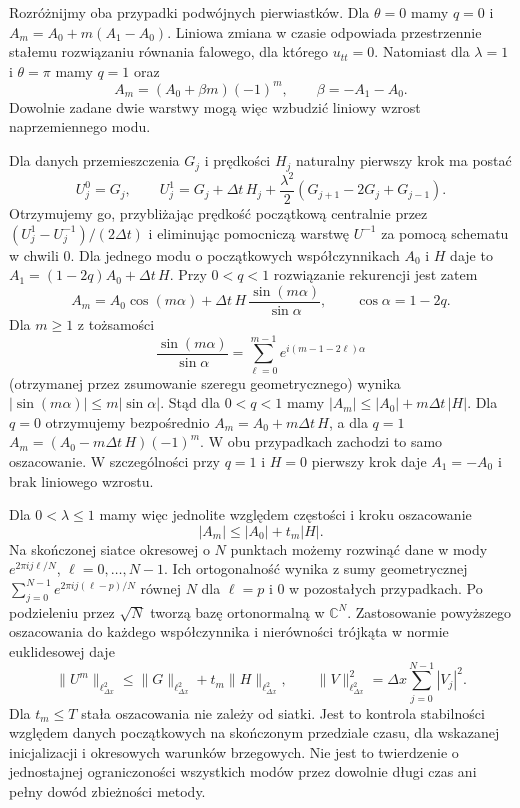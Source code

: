 \begin{uwaga}[Granica stabilności przy $\lambda=1$]
Rozróżnijmy oba przypadki podwójnych pierwiastków.
Dla $\theta=0$ mamy $q=0$ i
$A_m=A_0+m(A_1-A_0)$.
Liniowa zmiana w czasie odpowiada przestrzennie
stałemu rozwiązaniu równania falowego,
dla którego $u_{tt}=0$.
Natomiast dla $\lambda=1$ i $\theta=\pi$
mamy $q=1$ oraz
\[
 A_m=(A_0+\beta m)(-1)^m,\qquad
 \beta=-A_1-A_0.
\]
Dowolnie zadane dwie warstwy mogą więc wzbudzić
liniowy wzrost naprzemiennego modu.

Dla danych przemieszczenia $G_j$ i prędkości
$H_j$ naturalny pierwszy krok ma postać
\[
 U_j^0=G_j,\qquad
 U_j^1=G_j+\Delta t\,H_j+
 \frac{\lambda^2}{2}(G_{j+1}-2G_j+G_{j-1}).
\]
Otrzymujemy go, przybliżając prędkość początkową
centralnie przez $(U_j^1-U_j^{-1})/(2\Delta t)$
i eliminując pomocniczą warstwę $U^{-1}$
za pomocą schematu w chwili $0$.
Dla jednego modu o początkowych współczynnikach
$A_0$ i $H$ daje to $A_1=(1-2q)A_0+\Delta t\,H$.
Przy $0<q<1$ rozwiązanie rekurencji jest zatem
\[
 A_m=A_0\cos(m\alpha)
      +\Delta t\,H\,\frac{\sin(m\alpha)}{\sin\alpha},
 \qquad \cos\alpha=1-2q .
\]
Dla $m\geq1$ z tożsamości
\[
 \frac{\sin(m\alpha)}{\sin\alpha}
 =\sum_{\ell=0}^{m-1}e^{i(m-1-2\ell)\alpha}
\]
(otrzymanej przez zsumowanie szeregu
geometrycznego) wynika
$|\sin(m\alpha)|\leq m|\sin\alpha|$.
Stąd dla $0<q<1$ mamy
$|A_m|\leq |A_0|+m\Delta t\,|H|$.
Dla $q=0$ otrzymujemy bezpośrednio
$A_m=A_0+m\Delta t\,H$,
a dla $q=1$
$A_m=(A_0-m\Delta t\,H)(-1)^m$.
W obu przypadkach zachodzi to samo oszacowanie.
W szczególności przy $q=1$ i $H=0$ pierwszy
krok daje $A_1=-A_0$ i brak liniowego wzrostu.

Dla $0<\lambda\leq1$ mamy więc jednolite
względem częstości i kroku oszacowanie
\[
 |A_m|\leq |A_0|+t_m|H|.
\]
Na skończonej siatce okresowej o $N$ punktach
możemy rozwinąć dane w mody
$e^{2\pi i j\ell/N}$, $\ell=0,\ldots,N-1$.
Ich ortogonalność wynika z sumy geometrycznej
$\sum_{j=0}^{N-1}e^{2\pi i j(\ell-p)/N}$
równej $N$ dla $\ell=p$ i $0$ w pozostałych
przypadkach. Po podzieleniu przez $\sqrt N$
tworzą bazę ortonormalną w $\mathbb C^N$.
Zastosowanie powyższego oszacowania do
każdego współczynnika i nierówności trójkąta
w normie euklidesowej daje
\[
 \|U^m\|_{\ell^2_{\Delta x}}
 \leq\|G\|_{\ell^2_{\Delta x}}
       +t_m\|H\|_{\ell^2_{\Delta x}},
 \qquad
 \|V\|_{\ell^2_{\Delta x}}^2
 =\Delta x\sum_{j=0}^{N-1}|V_j|^2 .
\]
Dla $t_m\leq T$ stała oszacowania nie zależy
od siatki. Jest to kontrola stabilności
względem danych początkowych na skończonym
przedziale czasu, dla wskazanej inicjalizacji
i okresowych warunków brzegowych.
Nie jest to twierdzenie o jednostajnej
ograniczoności wszystkich modów przez dowolnie
długi czas ani pełny dowód zbieżności metody.
\end{uwaga}


